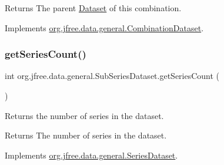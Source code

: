 \begin{DoxyReturn}{Returns}
The parent \mbox{\hyperlink{interfaceorg_1_1jfree_1_1data_1_1general_1_1_dataset}{Dataset}} of this combination. 
\end{DoxyReturn}


Implements \mbox{\hyperlink{interfaceorg_1_1jfree_1_1data_1_1general_1_1_combination_dataset_aba6918d290f095187907982432506bfe}{org.\+jfree.\+data.\+general.\+Combination\+Dataset}}.

\mbox{\label{classorg_1_1jfree_1_1data_1_1general_1_1_sub_series_dataset_a538de339ae10fe14821324e06f441368}} 
\subsubsection{\texorpdfstring{get\+Series\+Count()}{getSeriesCount()}}
{\footnotesize\ttfamily int org.\+jfree.\+data.\+general.\+Sub\+Series\+Dataset.\+get\+Series\+Count (\begin{DoxyParamCaption}{ }\end{DoxyParamCaption})}

Returns the number of series in the dataset.

\begin{DoxyReturn}{Returns}
The number of series in the dataset. 
\end{DoxyReturn}


Implements \mbox{\hyperlink{interfaceorg_1_1jfree_1_1data_1_1general_1_1_series_dataset_a84fe822f5918f941d9de1ed1b73c9f58}{org.\+jfree.\+data.\+general.\+Series\+Dataset}}.

\mbox{\label{classorg_1_1jfree_1_1data_1_1general_1_1_sub_series_dataset_a5eec016075fbcf13d31d781448759f75}} 
